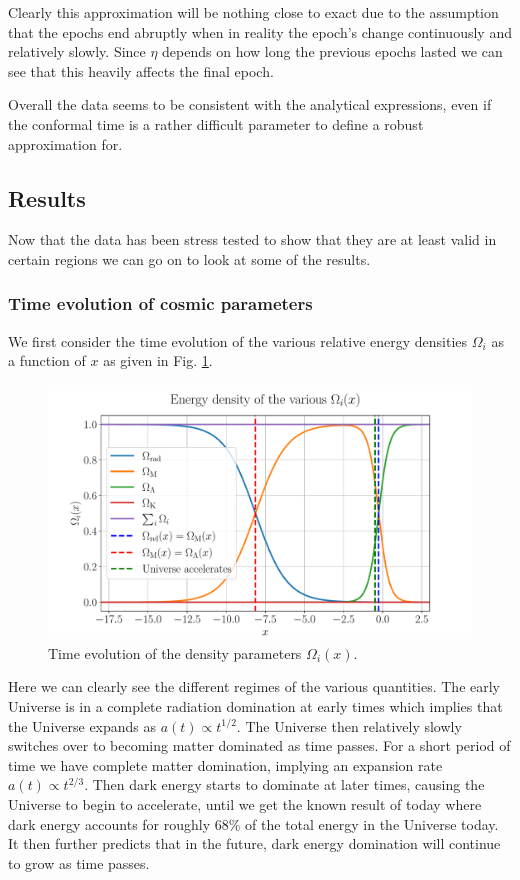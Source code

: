 \documentclass[%
reprint,
 amsmath,amssymb,
 aps,
]{revtex4-2}
\begin{document}
Clearly this approximation will be nothing close to exact due to the assumption that the epochs end abruptly when in reality the epoch's change continuously and relatively slowly. Since $\eta$ depends on how long the previous epochs lasted we can see that this heavily affects the final epoch. 

Overall the data seems to be consistent with the analytical expressions, even if the conformal time is a rather difficult parameter to define a robust approximation for.

\subsection{Results}

Now that the data has been stress tested to show that they are at least valid in certain regions we can go on to look at some of the results.
\subsubsection{Time evolution of cosmic parameters}
We first consider the time evolution of the various relative energy densities $\Omega_i$ as a function of $x$ as given in Fig. \ref{fig:Omegai}.
\begin{figure}[ht!]
	\includegraphics[width = \linewidth]{Figures/Omega_i.pdf}
	\caption{Time evolution of the density parameters $\Omega_i(x)$.}
	\label{fig:Omegai}
\end{figure}

Here we can clearly see the different regimes of the various quantities. The early Universe is in a complete radiation domination at early times which implies that the Universe expands as $a(t)\propto t^{1/2}$. The Universe then relatively slowly switches over to becoming matter dominated as time passes. For a short period of time we have complete matter domination, implying an expansion rate $a(t)\propto t^{2/3}$. Then dark energy starts to dominate at later times, causing the Universe to begin to accelerate, until we get the known result of today where dark energy accounts for roughly 68\% of the total energy in the Universe today. It then further predicts that in the future, dark energy domination will continue to grow as time passes.
\end{document}
